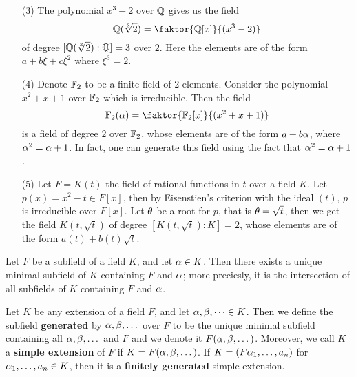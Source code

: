 \begin{example}
\begin{enumerate}
        \item[(3)] The polynomial $x^3-2$ over  $\mathbb{Q}$ gives us the field
            \begin{equation*}
                \Q(\sqrt[3]{2})=\faktor{\Q[x]}{(x^3-2)}
            \end{equation*}
            of degree $[\mathbb{Q}(\sqrt[3]{2}) : \mathbb{Q}]=3$ over $2$. Here the elements are
            of the form $a+b\xi+c\xi^2$ where $\xi^3=2$.

        \item[(4)] Denote $\mathbb{F}_2$ to be a finite field of $2$ elements. Consider
            the polynomial  $x^2+x+1$ over  $\mathbb{F}_2$ which is irreducible. Then
            the field
            \begin{equation*}
                \F_2(\a)=\faktor{\F_2[x]}{(x^2+x+1)}
            \end{equation*}
            is a field of degree $2$ over  $\mathbb{F}_2$, whose elements are of the
            form $a+b\alpha$, where  $\alpha^2=\alpha+1$. In fact, one can generate this
            field using the fact that  $\alpha^2=\alpha+1$.

        \item[(5)] Let $F=K(t)$ the field of rational functions in $t$ over a field
            $K$. Let $p(x)=x^2-t \in F[x]$, then by Eisenstien's criterion with
            the ideal $(t)$, $p$ is irreducible over  $F[x]$. Let $\theta$ be a
            root for  $p$, that is  $\theta=\sqrt{t}$, then we get the field
            $K(t,\sqrt{t})$ of degree $[K(t,\sqrt{t}) : K]=2$, whose elements are
            of the form $a(t)+b(t)\sqrt{t}$.
    \end{enumerate}
\end{example}

\begin{lemma}\label{1.1.7}
    Let $F$ be a subfield of a field $K$, and let  $\alpha \in K$. Then there exists
    a unique minimal subfield of  $K$ containing  $F$ and  $\alpha$; more preciesly,
    it is the intersection of all subfields of  $K$ containing $F$ and $\alpha$.
\end{lemma}

\begin{definition}
    Let $K$ be any extension of a field $F$, and let  $\alpha, \beta, \dots \in K$.
    Then we define the subfield \textbf{generated} by $\alpha, \beta, \dots$
    over  $F$ to be the unique minimal subfield containing all $\alpha,\beta, \dots$
    and $F$ and we denote it  $F(\alpha, \beta, \dots)$. Moreover, we call $K$ a
    \textbf{simple extension} of $F$ if  $K=F(\alpha, \beta, \dots)$. If $K=(F\alpha_1,
    \dots, a_n)$ for $\alpha_1, \dots, a_n \in K$, then it is a \textbf{finitely
    generated} simple extension.
\end{definition}

